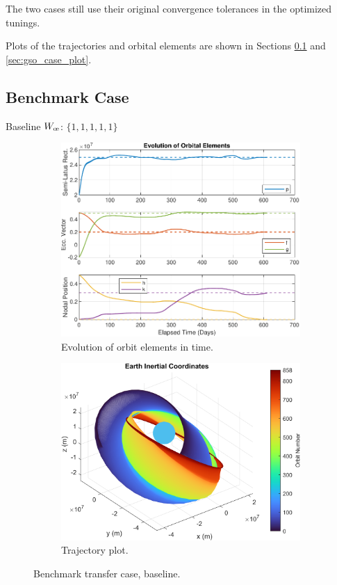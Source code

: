 The two cases still use their original convergence tolerances in the optimized tunings.

Plots of the trajectories and orbital elements are shown in Sections \ref{sec:bench_case_plot} and \ref{sec:gso_case_plot}.

\subsection{Benchmark Case}
\label{sec:bench_case_plot}
Baseline $W_{\moe}$: $\{1, 1, 1, 1, 1\}$
\begin{figure}[H]
    \centering
    \begin{subfigure}[t]{0.49\textwidth}
        \includegraphics[width=\textwidth]{figures/benchmark_transfer/orbital_elements.pdf}
        \caption{Evolution of orbit elements in time.}
        \label{fig:results_benchmark_a}
    \end{subfigure}
    \begin{subfigure}[t]{0.49\textwidth}
        \includegraphics[width=\textwidth]{figures/benchmark_transfer/trajectory_plot.png}
        \caption{Trajectory plot.}
        \label{fig:results_benchmark_b}
    \end{subfigure}
    \caption{Benchmark transfer case, baseline.}
    \label{fig:results_benchmark}
\end{figure}


